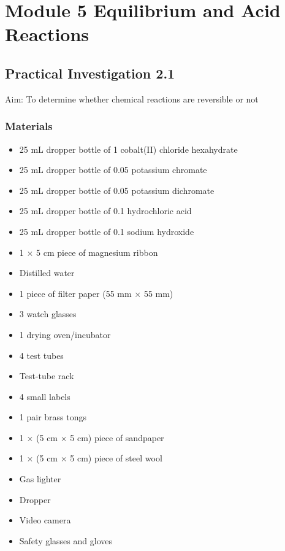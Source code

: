 
\chapter{Module 5 \; Equilibrium and Acid Reactions}

\section{Practical Investigation 2.1} \label{23/10/2024}
	Aim: To determine whether chemical reactions are reversible or not

	\subsection{Materials}
		\begin{itemize}
			\item 25 mL dropper bottle of \qty{1}{\moLar} cobalt(II) chloride hexahydrate
			\item 25 mL dropper bottle of \qty{0.05}{\moLar} potassium chromate
			\item 25 mL dropper bottle of \qty{0.05}{\moLar} potassium dichromate
			\item 25 mL dropper bottle of \qty{0.1}{\moLar} hydrochloric acid
			\item 25 mL dropper bottle of \qty{0.1}{\moLar} sodium hydroxide
			\item 1 $\times$ 5 cm piece of magnesium ribbon
			\item Distilled water
			\item 1 piece of filter paper (55 mm $\times$ 55 mm)
			\item 3 watch glasses
			\item 1 drying oven/incubator
			\item 4 test tubes
			\item Test-tube rack
			\item 4 small labels
			\item 1 pair brass tongs
			\item 1 $\times$ (5 cm $\times$ 5 cm) piece of sandpaper
			\item 1 $\times$ (5 cm $\times$ 5 cm) piece of steel wool
			\item Gas lighter
			\item Dropper
			\item Video camera
			\item Safety glasses and gloves
		\end{itemize}

